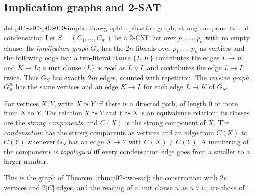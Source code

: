 \subsection{Implication graphs and 2-SAT}
\label{sec:p02-w02-p02-019-two-sat}

\begin{hbdefinition}{def:p02-w02-p02-019-implication-graph}{Implication graph, strong components and condensation}
Let \(S=(C_1,\ldots,C_m)\) be a 2-CNF list over \(p_1,\ldots,p_n\) with no empty
clause.  Its \emph{implication graph} \(G_S\) has the \(2n\) literals over
\(p_1,\ldots,p_n\) as vertices and the following edge list: a two-literal
clause \(\{L,K\}\) contributes the edges \(\overline L\to K\) and
\(\overline K\to L\); a unit clause \(\{L\}\) is read as \(L\lor L\) and
contributes the edge \(\overline L\to L\) twice.  Thus \(G_S\) has exactly
\(2m\) edges, counted with repetition.  The \emph{reverse graph}
\(G_S^{\mathrm R}\) has the same vertices and an edge \(K\to L\) for each edge
\(L\to K\) of \(G_S\).

For vertices \(X,Y\), write \(X\leadsto Y\) iff there is a directed path, of
length \(0\) or more, from \(X\) to \(Y\).  The relation \(X\leadsto Y\) and
\(Y\leadsto X\) is an equivalence relation; its classes are the \emph{strong
components}, and \(C(X)\) is the strong component of \(X\).  The
\emph{condensation} has the strong components as vertices and an edge from
\(C(X)\) to \(C(Y)\) whenever \(G_S\) has an edge \(X\to Y\) with
\(C(X)\neq C(Y)\).  A numbering of the components is \emph{topological} iff
every condensation edge goes from a smaller to a larger number.
\end{hbdefinition}

This is the graph of Theorem~\ref{thm:p02-two-sat}; the construction with
\(2n\) vertices and \(2|C|\) edges, and the reading of a unit clause \(u\) as
\(u\lor u\), are those of \textcite[121]{AspvallPlassTarjan1979}.


